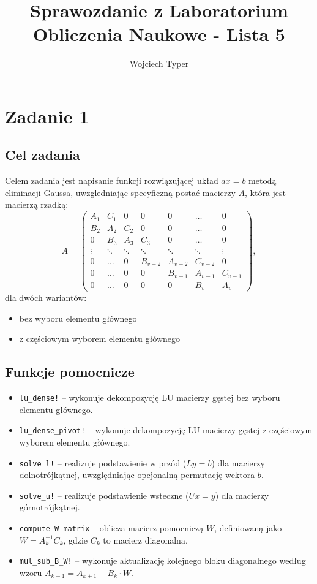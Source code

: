\documentclass{article}
\title{Sprawozdanie z Laboratorium\\Obliczenia Naukowe - Lista 5}
\author{Wojciech Typer}
\begin{document}
\maketitle
\section*{Zadanie 1}
\subsection*{Cel zadania}
Celem zadania jest napisanie funkcji rozwiązującej układ $ax = b$ metodą eliminacji Gaussa, 
uwzgledniając specyficzną postać macierzy $A$, która jest macierzą rzadką:
\[
A = 
\begin{pmatrix}
A_1    & C_1    & 0      & 0      & 0      & \dots  & 0      \\
B_2    & A_2    & C_2    & 0      & 0      & \dots  & 0      \\
0      & B_3    & A_3    & C_3    & 0      & \dots  & 0      \\
\vdots & \ddots & \ddots & \ddots & \ddots & \ddots & \vdots \\
0      & \dots  & 0      & B_{v-2} & A_{v-2} & C_{v-2} & 0      \\
0      & \dots  & 0      & 0      & B_{v-1} & A_{v-1} & C_{v-1} \\
0      & \dots  & 0      & 0      & 0      & B_v     & A_v
\end{pmatrix},
\]
dla dwóch wariantów:
\begin{itemize}
    \item bez wyboru elementu głównego
    \item z częściowym wyborem elementu głównego
\end{itemize}

\subsection*{Funkcje pomocnicze}
\begin{itemize}
    \item \texttt{lu\_dense!} – wykonuje dekompozycję LU macierzy gęstej bez wyboru elementu głównego.
    \item \texttt{lu\_dense\_pivot!} – wykonuje dekompozycję LU macierzy gęstej z częściowym wyborem elementu głównego.
    \item \texttt{solve\_l!} – realizuje podstawienie w przód ($Ly=b$) dla macierzy dolnotrójkątnej, uwzględniając opcjonalną permutację wektora $b$.
    \item \texttt{solve\_u!} – realizuje podstawienie wsteczne ($Ux=y$) dla macierzy górnotrójkątnej.
    \item \texttt{compute\_W\_matrix} – oblicza macierz pomocniczą $W$, definiowaną jako $W = A_k^{-1} C_k$, gdzie $C_k$ to macierz diagonalna.
    \item \texttt{mul\_sub\_B\_W!} – wykonuje aktualizację kolejnego bloku diagonalnego według wzoru $A_{k+1} = A_{k+1} - B_k \cdot W$.
\end{itemize}
\end{document}
